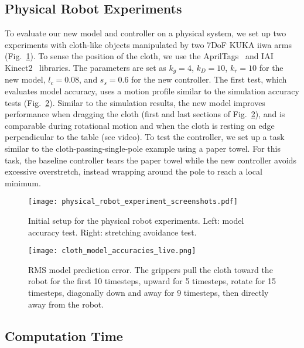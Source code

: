 \subsection{Physical Robot Experiments}

To evaluate our new model and controller on a physical system, we set up two experiments with cloth-like objects manipulated by two 7DoF KUKA iiwa arms (Fig.~\ref{Fig: physical_experiment_screenshots}). To sense the position of the cloth, we use the AprilTags~\cite{olson2011tags} and IAI Kinect2~\cite{iai_kinect2} libraries. The parameters are set as $k_g = 4$, $k_D = 10$, $k_{r} = 10$ for the new model, $l_c = 0.08$, and $s_s = 0.6$ for the new controller. The first test, which evaluates model accuracy, uses a motion profile similar to the simulation accuracy tests (Fig.~\ref{Fig: cloth_model_accuracies_live}). Similar to the simulation results, the new model improves performance when dragging the cloth (first and last sections of Fig.~\ref{Fig: cloth_model_accuracies_live}), and is comparable during rotational motion and when the cloth is resting on edge perpendicular to the table (see video). To test the controller, we set up a task similar to the cloth-passing-single-pole example using a paper towel. For this task, the baseline controller tears the paper towel while the new controller avoids excessive overstretch, instead wrapping around the pole to reach a local minimum.

\begin{figure}[t]
    \centering
    \texttt{[image: physical\_robot\_experiment\_screenshots.pdf]}
    \caption{Initial setup for the physical robot experiments. Left: model accuracy test. Right: stretching avoidance test.}
    \label{Fig: physical_experiment_screenshots}
\end{figure}


\begin{figure}[t]
    \centering
    \texttt{[image: cloth\_model\_accuracies\_live.png]}
    \caption{RMS model prediction error. The grippers pull the cloth toward the robot for the first 10 timesteps, upward for 5 timesteps, rotate for 15 timesteps, diagonally down and away for 9 timesteps, then directly away from the robot.}
    \label{Fig: cloth_model_accuracies_live}
\end{figure}



\subsection{Computation Time}


